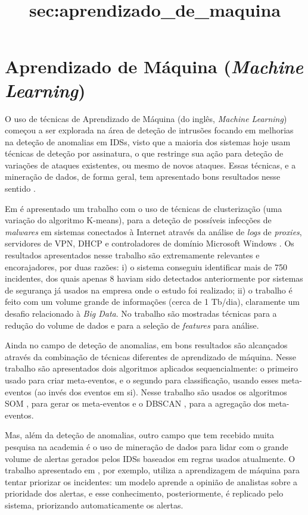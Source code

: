 \documentclass[
	12pt,				%
	openright,			%
	twoside,			%
	a4paper,			%
	english,			%
	spanish,			%
	brazil,				%
	]{abntex2}
\begin{document}
\section{Aprendizado de Máquina (\emph{Machine Learning})}\title{sec:aprendizado_de_maquina}
O uso de técnicas de Aprendizado de Máquina (do inglês, \emph{Machine Learning}) começou a ser explorada na área de deteção de intrusões focando em melhorias na deteção de anomalias em IDSs, visto que a maioria dos sistemas hoje usam técnicas de deteção por assinatura, o que restringe sua ação para deteção de variações de ataques existentes, ou mesmo de novos ataques. Essas técnicas, e a mineração de dados, de forma geral, tem apresentado bons resultados nesse sentido \cite{dua2011data, yen2013beehive, zomlot2013aiding, ganapathy2012intelligent, li2013automatic, joseph2012machine}.

Em \cite{yen2013beehive} é apresentado um trabalho com o uso de técnicas de clusterização (uma variação do algoritmo K-means\cite{ball1967clustering}), para a deteção de possíveis infecções de \emph{malwares} em sistemas conectados à Internet através da análise de \emph{logs} de \emph{proxies}, servidores de VPN, DHCP e controladores de domínio Microsoft Windows \texttrademark. Os resultados apresentados nesse trabalho são extremamente relevantes e encorajadores, por duas razões: i) o sistema conseguiu identificar mais de 750 incidentes, dos quais apenas 8 haviam sido detectados anteriormente por sistemas de segurança já usados na empresa onde o estudo foi realizado; ii) o trabalho é feito com um volume grande de informações (cerca de 1 Tb/dia), claramente um desafio relacionado à \emph{Big Data}. No trabalho são mostradas técnicas para a redução do volume de dados e para a seleção de \emph{features} para análise.

Ainda no campo de deteção de anomalias, em \cite{li2013automatic} bons resultados são alcançados através da combinação de técnicas diferentes de aprendizado de máquina. Nesse trabalho são apresentados dois algoritmos aplicados sequencialmente: o primeiro usado para criar meta-eventos, e o segundo para classificação, usando esses meta-eventos (ao invés dos eventos em si). Nesse trabalho são usados os algoritmos SOM \cite{kohonen1989self}, para gerar os meta-eventos e o DBSCAN \cite{ester1996density}, para a agregação dos meta-eventos.

Mas, além da deteção de anomalias, outro campo que tem recebido muita pesquisa na academia é o uso de mineração de dados para lidar com o grande volume de alertas gerados pelos IDSs baseados em regras usados atualmente. O trabalho apresentado em \cite{zomlot2013aiding}, por exemplo, utiliza a aprendizagem de máquina para tentar priorizar os incidentes: um modelo aprende a opinião de analistas sobre a prioridade dos alertas, e esse conhecimento, posteriormente, é replicado pelo sistema, priorizando automaticamente os alertas.
\end{document}
